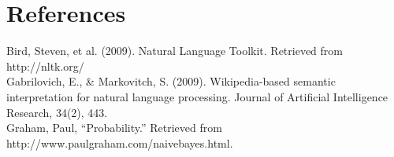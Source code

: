 \documentclass[12pt]{article}
\begin{document}
\section*{References}

\indent Bird, Steven, et al. (2009). Natural Language Toolkit. Retrieved from http://nltk.org/\\

Gabrilovich, E., \& Markovitch, S. (2009). Wikipedia-based semantic interpretation for natural language processing. Journal of Artificial Intelligence Research, 34(2), 443.\\

Graham, Paul, ``Probability.'' Retrieved from http://www.paulgraham.com/naivebayes.html.
\end{document}
